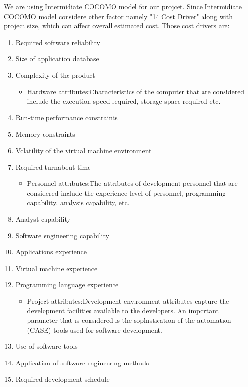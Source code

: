 \documentclass[12pt]{article}
\begin{document}
We are using Intermidiate COCOMO model for our projcet. Since Intermidiate COCOMO model considere other factor namely  "14 Cost Driver" along with project size, which can affect overall estimated cost. Those cost drivers are:
\begin{enumerate}

  \begin{itemize}
    \item Product attributes:The characteristics of the product that are considered include the inherent complexity of the product, reliability requirements of the product, etc.
    \end{itemize}
    
     \item Required software reliability
    \item   Size of application database
    \item   Complexity of the product
    
 \begin{itemize}
    \item Hardware attributes:Characteristics of the computer that are considered include the execution speed required, storage space required etc.
 \end{itemize}
 
\item  Run-time performance constraints
\item Memory constraints
\item Volatility of the virtual machine environment
\item Required turnabout time


\begin{itemize}
   
\item Personnel attributes:The attributes of development personnel that are considered include
the experience level of personnel, programming capability, analysis capability,
etc.
\end{itemize}

\item Analyst capability
\item Software engineering capability
\item Applications experience
\item Virtual machine experience
\item Programming language experience

\begin{itemize}
   
\item Project attributes:Development environment attributes capture the
development facilities available to the developers. An important parameter that is considered is the sophistication of the automation (CASE) tools used for software development.
\end{itemize}

\item Use of software tools
\item Application of software engineering methods
\item Required development schedule


\end{enumerate}
\end{document}
